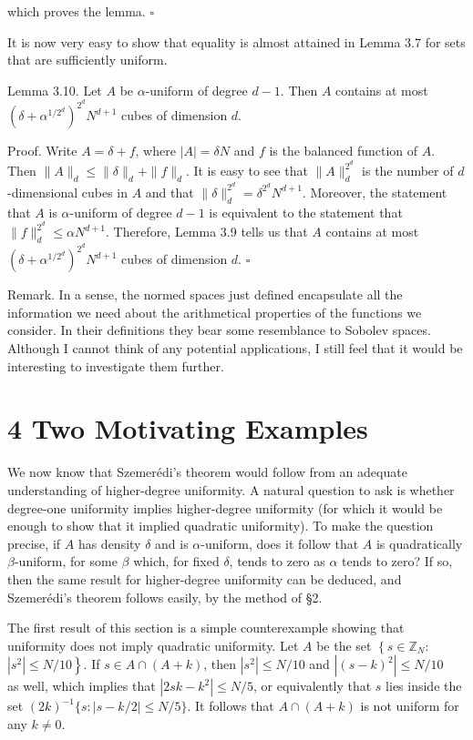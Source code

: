 \documentclass[10pt]{article}
\begin{document}
which proves the lemma. \(\square\)

It is now very easy to show that equality is almost attained in Lemma 3.7 for sets that are sufficiently uniform.

Lemma 3.10. Let $A$ be $\alpha$-uniform of degree $d-1$. Then $A$ contains at most $\left(\delta+\alpha^{1 / 2^{d}}\right)^{2^{d}} N^{d+1}$ cubes of dimension $d$.

Proof. Write $A=\delta+f$, where $|A|=\delta N$ and $f$ is the balanced function of $A$. Then $\|A\|_{d} \leqslant\|\delta\|_{d}+\|f\|_{d}$. It is easy to see that $\|A\|_{d}^{2^{d}}$ is the number of $d$-dimensional cubes in $A$ and that $\|\delta\|_{d}^{2^{d}}=\delta^{2^{d}} N^{d+1}$. Moreover, the statement that $A$ is $\alpha$-uniform of degree $d-1$ is equivalent to the statement that $\|f\|_{d}^{2^{d}} \leqslant \alpha N^{d+1}$. Therefore, Lemma 3.9 tells us that $A$ contains at most $\left(\delta+\alpha^{1 / 2^{d}}\right)^{2^{d}} N^{d+1}$ cubes of dimension $d$. \(\square\)

Remark. In a sense, the normed spaces just defined encapsulate all the information we need about the arithmetical properties of the functions we consider. In their definitions they bear some resemblance to Sobolev spaces. Although I cannot think of any potential applications, I still feel that it would be interesting to investigate them further.

\section*{4 Two Motivating Examples}
We now know that Szemerédi's theorem would follow from an adequate understanding of higher-degree uniformity. A natural question to ask is whether degree-one uniformity implies higher-degree uniformity (for which it would be enough to show that it implied quadratic uniformity). To make the question precise, if $A$ has density $\delta$ and is $\alpha$-uniform, does it follow that $A$ is quadratically $\beta$-uniform, for some $\beta$ which, for fixed $\delta$, tends to zero as $\alpha$ tends to zero? If so, then the same result for higher-degree uniformity can be deduced, and Szemerédi's theorem follows easily, by the method of §2.

The first result of this section is a simple counterexample showing that uniformity does not imply quadratic uniformity. Let $A$ be the set $\left\{s \in \mathbb{Z}_{N}:\right.$ $\left.\left|s^{2}\right| \leqslant N / 10\right\}$. If $s \in A \cap(A+k)$, then $\left|s^{2}\right| \leqslant N / 10$ and $\left|(s-k)^{2}\right| \leqslant N / 10$\\
as well, which implies that $\left|2 s k-k^{2}\right| \leqslant N / 5$, or equivalently that $s$ lies inside the set $(2 k)^{-1}\{s:|s-k / 2| \leqslant N / 5\}$. It follows that $A \cap(A+k)$ is not uniform for any $k \neq 0$.
\end{document}
